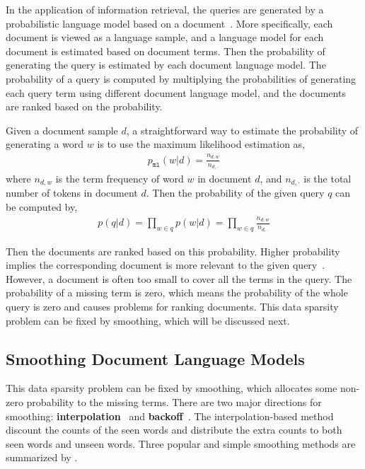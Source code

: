 In the application of information retrieval, the queries are generated by a probabilistic language model based on a document~\citep{zhai-01}. More specifically, each document is viewed as a language sample, and a language model for each document is estimated based on document terms. Then the probability of generating the query is estimated by each document language model. The probability of a query is computed by multiplying the probabilities of generating each query term using different document language model, and the documents are ranked based on the probability. 

Given a document sample $d$, a straightforward way to estimate the probability of generating a word $w$ is to use the maximum likelihood estimation as,
\begin{align}
p_{\texttt{ml}}(w|d) = \frac{n_{d,w}}{n_{d,\cdot}}
\label{eq:ir_mse}
\end{align}
where $n_{d,w}$ is the term frequency of word $w$ in document $d$, and $n_{d,\cdot}$ is the total number of tokens in document $d$. Then the probability of the given query $q$ can be computed by,
\begin{align}
p(q|d) = \prod_{w \in q} p(w|d) = \prod_{w \in q} \frac{n_{d,w}}{n_{d,\cdot}}
\end{align}

Then the documents are ranked based on this probability. Higher probability implies the corresponding document is more relevant to the given query~\citep{song-99}. However, a document is often too small to cover all the terms in the query. The probability of a missing term is zero, which means the probability of the whole query is zero and causes problems for ranking documents. This data sparsity problem can be fixed by smoothing, which will be discussed next.

\subsection{Smoothing Document Language Models}

This data sparsity problem can be fixed by smoothing, which allocates some non-zero probability to the missing terms. There are two major directions for smoothing: \textbf{interpolation}~\citep{Jelinek-1980,mackay95dirichlet,Ney-1994,PonteCroft,zhai-01} and \textbf{backoff}~\citep{katz-87,song-99}. The interpolation-based method discount the counts of the seen words and distribute the extra counts to both seen words and unseen words. Three popular and simple smoothing methods are summarized by \cite{zhai-01}. 

